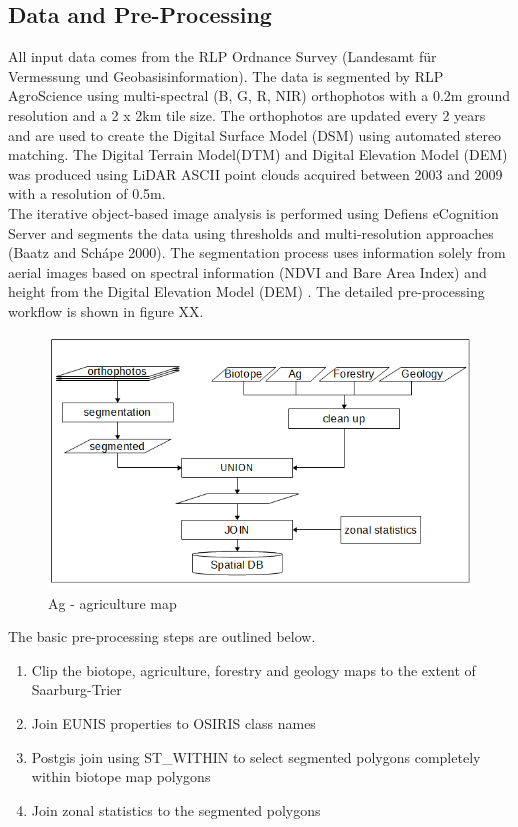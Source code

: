 \documentclass[authoryear, review,12pt,number]{elsarticle}
\begin{document}
\subsection{Data and Pre-Processing}
All input data comes from the RLP Ordnance Survey (Landesamt f\"ur Vermessung 
und Geobasisinformation). The data is segmented by RLP AgroScience using
multi-spectral (B, G, R, NIR) orthophotos with a 0.2m ground resolution and a
2 x 2km tile size. The orthophotos are updated every 2 years and are used to
create the Digital Surface Model (DSM) using automated stereo matching. The
Digital Terrain Model(DTM) and Digital Elevation Model (DEM) was produced using
LiDAR ASCII point clouds acquired between 2003 and 2009 with a resolution of
0.5m.\\
The iterative object-based image analysis is performed using Defiens eCognition Server
and segments the data using thresholds and multi-resolution approaches (Baatz and
Sch\'ape 2000). The segmentation process uses information solely from aerial
images based on spectral information (NDVI and Bare Area Index) and
height from the Digital Elevation Model (DEM) \citep{Tintrup2015}.
The detailed pre-processing workflow is shown in figure XX.
\begin{figure}
	\includegraphics[width=1\textwidth]{diagrams/pre_processing.png}
	\caption{Ag - agriculture map}
\end{figure}

The basic pre-processing steps are outlined below.
\begin{enumerate}
    \item Clip the biotope, agriculture, forestry and geology maps to the extent
    of Saarburg-Trier
    \item Join EUNIS properties to OSIRIS class names
    \item Postgis join using ST\_WITHIN to select segmented polygons
    completely within biotope map polygons
    \item Join zonal statistics to the segmented polygons
\end{enumerate}
\end{document}
